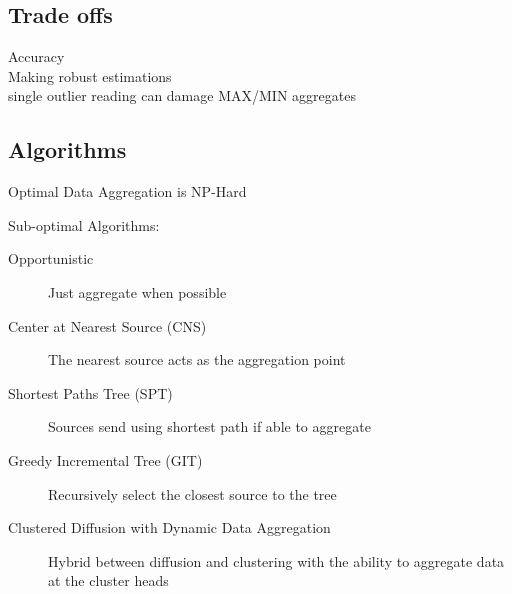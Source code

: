 \subsection{Trade offs}

Accuracy 
\\
Making robust estimations
\\
single outlier reading can damage MAX/MIN aggregates

\subsection{Algorithms}
Optimal Data Aggregation is NP-Hard

Sub-optimal Algorithms:
\begin{description}
	\item[Opportunistic] Just aggregate when possible
	\item[Center at Nearest Source (CNS)] The nearest source acts as the
		aggregation point
	\item[Shortest Paths Tree (SPT)] Sources send using shortest path if able
		to aggregate
	\item[Greedy Incremental Tree (GIT)] Recursively select the closest source
		to the tree
	\item[Clustered Diffusion with Dynamic Data Aggregation] Hybrid between
		diffusion and clustering with the ability to aggregate data at the
		cluster heads
\end{description}

